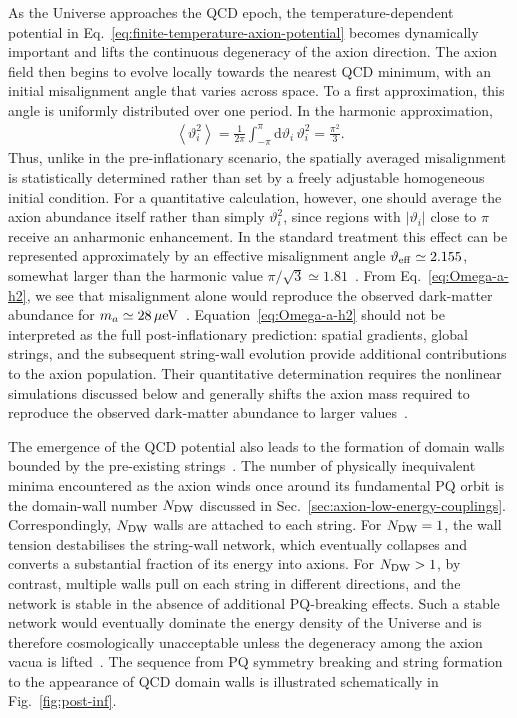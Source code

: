 \documentclass[review]{elsarticle}
\numberwithin{equation}{section}
\numberwithin{table}{section}
\numberwithin{figure}{section}
\def\d{\mathrm{d}}
\begin{document}
As the Universe approaches the QCD epoch, the temperature-dependent potential in Eq.~\eqref{eq:finite-temperature-axion-potential} becomes dynamically important and lifts the continuous degeneracy of the axion direction. The axion field then begins to evolve locally towards the nearest QCD minimum, with an initial misalignment angle that varies across space. To a first approximation, this angle is uniformly distributed over one period. In the harmonic approximation,
\begin{align}
    \left\langle\vartheta_i^2\right\rangle
    =
    \frac{1}{2\pi}
    \int_{-\pi}^{\pi}\d\vartheta_i\,
    \vartheta_i^2
    =
    \frac{\pi^2}{3}.
    \label{eq:postinflation-misalignment-average}
\end{align}
Thus, unlike in the pre-inflationary scenario, the spatially averaged misalignment is statistically determined rather than set by a freely adjustable homogeneous initial condition. For a quantitative calculation, however, one should average the axion abundance itself rather than simply $\vartheta_i^2$, since regions with $|\vartheta_i|$ close to $\pi$ receive an anharmonic enhancement. In the standard treatment this effect can be represented approximately by an effective misalignment angle $\vartheta_{\rm eff}\simeq2.155$, somewhat larger than the harmonic value $\pi/\sqrt{3}\simeq1.81$~\cite{Borsanyi:2016ksw,OHare:2024nmr}. From Eq.~\eqref{eq:Omega-a-h2}, we see that misalignment alone would reproduce the observed dark-matter abundance for $m_a\simeq28\,\mu{\rm eV}$~\cite{Borsanyi:2016ksw,OHare:2024nmr}. Equation~\eqref{eq:Omega-a-h2} should not be interpreted as the full post-inflationary prediction: spatial gradients, global strings, and the subsequent string-wall evolution provide additional contributions to the axion population. Their quantitative determination requires the nonlinear simulations discussed below and generally shifts the axion mass required to reproduce the observed dark-matter abundance to larger values~\cite{Gorghetto:2018myk,Gorghetto:2020qws,Buschmann:2021sdq,Kim:2024wku,Kaltschmidt:2025nkz}.


The emergence of the QCD potential also leads to the formation of domain walls bounded by the pre-existing strings~\cite{Sikivie:1982qv}. The number of physically inequivalent minima encountered as the axion winds once around its fundamental PQ orbit is the domain-wall number $N_{\rm DW}$ discussed in Sec.~\ref{sec:axion-low-energy-couplings}. Correspondingly, $N_{\rm DW}$ walls are attached to each string. For $N_{\rm DW}=1$, the wall tension destabilises the string-wall network, which eventually collapses and converts a substantial fraction of its energy into axions. For $N_{\rm DW}>1$, by contrast, multiple walls pull on each string in different directions, and the network is stable in the absence of additional PQ-breaking effects. Such a stable network would eventually dominate the energy density of the Universe and is therefore cosmologically unacceptable unless the degeneracy among the axion vacua is lifted~\cite{Sikivie:1982qv,Hiramatsu:2012gg}. The sequence from PQ symmetry breaking and string formation to the appearance of QCD domain walls is illustrated schematically in Fig.~\ref{fig:post-inf}.
\end{document}
